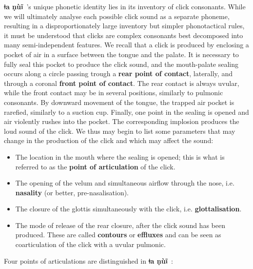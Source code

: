 \documentclass[11pt]{book}
\newcommand{\qcn}[1]{\textbf{#1}}
\newcommand{\langname}{\qcn{ǂa ṇùĩ}~}
\begin{document}
\langname's unique phonetic identity lies in its inventory of click consonants. While we will ultimately analyse each possible click sound as a separate phoneme, resulting in a disproportionately large inventory but simpler phonotactical rules, it must be understood that clicks are complex consonants best decomposed into many semi-independent features. We recall that a click is produced by enclosing a pocket of air in a surface between the tongue and the palate. It is necessary to fully seal this pocket to produce the click sound, and the mouth-palate sealing occurs along a circle passing trough a \textbf{rear point of contact}, laterally, and through a coronal \textbf{front point of contact}. The rear contact is always uvular, while the front contact may be in several positions, similarly to pulmonic consonants. By downward movement of the tongue, the trapped air pocket is rarefied, similarly to a suction cup. Finally, one point in the sealing is opened and air violently rushes into the pocket. The corresponding implosion produces the loud sound of the click. We thus may begin to list some parameters that may change in the production of the click and which may affect the sound:

\begin{itemize}
	\item The location in the mouth where the sealing is opened; this is what is referred to as the \textbf{point of articulation} of the click.
	\item The opening of the velum and simultaneous airflow through the nose, i.e. \textbf{nasality} (or better, pre-nasalisation).
	\item The closure of the glottis simultaneously with the click, i.e. \textbf{glottalisation}.
	\item The mode of release of the rear closure, after the click sound has been produced. These are called \textbf{contours} or \textbf{effluxes} and can be seen as coarticulation of the click with a uvular pulmonic.
\end{itemize}

Four points of articulations are distinguished in \langname:
\end{document}
